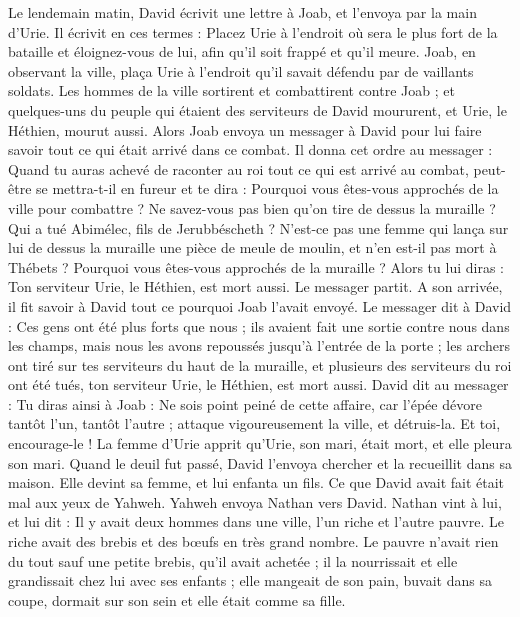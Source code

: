 \begin{multicols}{2}
Le lendemain matin, David écrivit une lettre à Joab, et l'envoya par la main d'Urie.
Il écrivit en ces termes : Placez Urie à l'endroit où sera le plus fort de la bataille et éloignez-vous de lui, afin qu'il soit frappé et qu'il meure.
Joab, en observant la ville, plaça Urie à l'endroit qu'il savait défendu par de vaillants soldats.
Les hommes de la ville sortirent et combattirent contre Joab ; et quelques-uns du peuple qui étaient des serviteurs de David moururent, et Urie, le Héthien, mourut aussi.
Alors Joab envoya un messager à David pour lui faire savoir tout ce qui était arrivé dans ce combat.
Il donna cet ordre au messager : Quand tu auras achevé de raconter au roi tout ce qui est arrivé au combat,
peut-être se mettra-t-il en fureur et te dira : Pourquoi vous êtes-vous approchés de la ville pour combattre ? Ne savez-vous pas bien qu'on tire de dessus la muraille ?
Qui a tué Abimélec, fils de Jerubbéscheth ? N'est-ce pas une femme qui lança sur lui de dessus la muraille une pièce de meule de moulin, et n'en est-il pas mort à Thébets ? Pourquoi vous êtes-vous approchés de la muraille ? Alors tu lui diras : Ton serviteur Urie, le Héthien, est mort aussi.
Le messager partit. A son arrivée, il fit savoir à David tout ce pourquoi Joab l'avait envoyé.
Le messager dit à David : Ces gens ont été plus forts que nous ; ils avaient fait une sortie contre nous dans les champs, mais nous les avons repoussés jusqu'à l'entrée de la porte ;
les archers ont tiré sur tes serviteurs du haut de la muraille, et plusieurs des serviteurs du roi ont été tués, ton serviteur Urie, le Héthien, est mort aussi.
David dit au messager : Tu diras ainsi à Joab : Ne sois point peiné de cette affaire, car l'épée dévore tantôt l'un, tantôt l'autre ; attaque vigoureusement la ville, et détruis-la. Et toi, encourage-le !
La femme d'Urie apprit qu'Urie, son mari, était mort, et elle pleura son mari.
Quand le deuil fut passé, David l'envoya chercher et la recueillit dans sa maison. Elle devint sa femme, et lui enfanta un fils. Ce que David avait fait était mal aux yeux de Yahweh.
\VerseOne{}Yahweh envoya Nathan vers David. Nathan vint à lui, et lui dit : Il y avait deux hommes dans une ville, l'un riche et l'autre pauvre.
Le riche avait des brebis et des bœufs en très grand nombre.
Le pauvre n'avait rien du tout sauf une petite brebis, qu'il avait achetée ; il la nourrissait et elle grandissait chez lui avec ses enfants ; elle mangeait de son pain, buvait dans sa coupe, dormait sur son sein et elle était comme sa fille.

\end{multicols}
